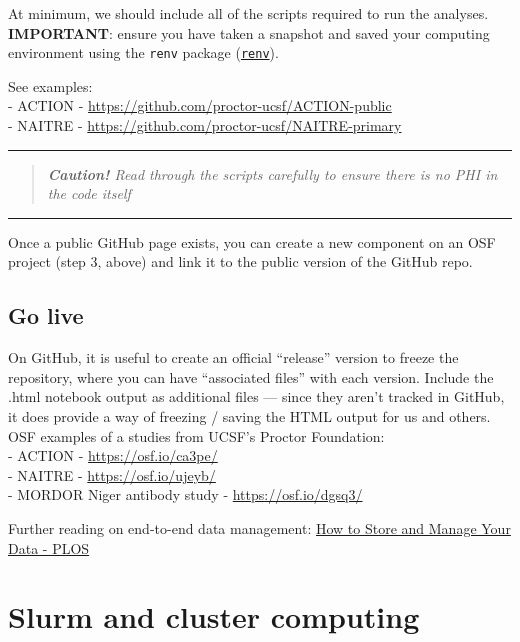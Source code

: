 \documentclass[
]{book}
\begin{document}
At minimum, we should include all of the scripts required to run the analyses. \textbf{IMPORTANT}: ensure you have taken a snapshot and saved your computing environment using the \texttt{renv} package (\hyperref[renv]{\texttt{renv}}).

See examples:\\
- ACTION - \url{https://github.com/proctor-ucsf/ACTION-public}\\
- NAITRE - \url{https://github.com/proctor-ucsf/NAITRE-primary}

\begin{center}\rule{0.5\linewidth}{0.5pt}\end{center}

\begin{quote}
\emph{\textbf{Caution!} Read through the scripts carefully to ensure there is no PHI in the code itself }
\end{quote}

\begin{center}\rule{0.5\linewidth}{0.5pt}\end{center}

Once a public GitHub page exists, you can create a new component on an OSF project (step 3, above) and link it to the public version of the GitHub repo.

\section{Go live}\label{go-live}

On GitHub, it is useful to create an official ``release'' version to freeze the repository, where you can have ``associated files'' with each version. Include the .html notebook output as additional files --- since they aren't tracked in GitHub, it does provide a way of freezing / saving the HTML output for us and others. OSF examples of a studies from UCSF's Proctor Foundation:\\
- ACTION - \url{https://osf.io/ca3pe/}\\
- NAITRE - \url{https://osf.io/ujeyb/}\\
- MORDOR Niger antibody study - \url{https://osf.io/dgsq3/}

Further reading on end-to-end data management: \href{https://plos.org/resource/how-to-store-and-manage-your-data/\#data-management-plan}{How to Store and Manage Your Data - PLOS}

\chapter{Slurm and cluster computing}\label{slurm}
\end{document}
